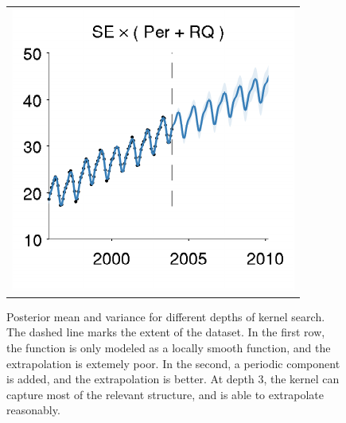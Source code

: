 \documentclass[twoside]{article}
\begin{document}
\begin{figure}[h!]
\begin{tabular}{c}
\hspace{-0.7cm} \includegraphics[width=\wmg,height=\hmg]{../figures/decomposition/11-Feb-v4-03-mauna2003-s_max_level_2/03-mauna2003-s_all_small}
\end{tabular}
\caption{Posterior mean and variance for different depths of kernel search.  The dashed line marks the extent of the dataset.  In the first row, the function is only modeled as a locally smooth function, and the extrapolation is extemely poor.  In the second, a periodic component is added, and the extrapolation is better.  At depth 3, the kernel can capture most of the relevant structure, and is able to extrapolate reasonably. %
}
\label{fig:mauna_grow}
\end{figure}
\end{document}
